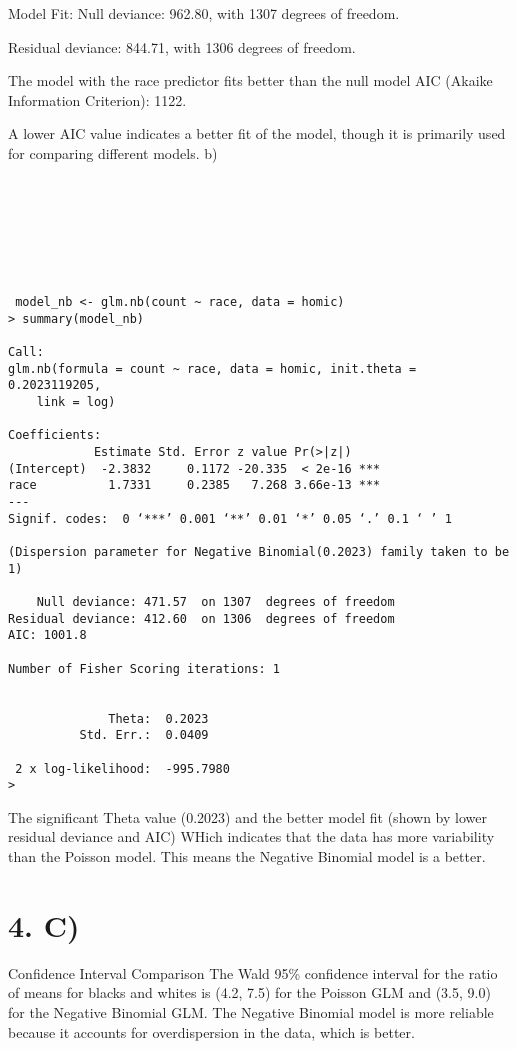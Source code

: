 \documentclass{article}
\begin{document}
Model Fit:
Null deviance: 962.80, with 1307 degrees of freedom.

Residual deviance: 844.71, with 1306 degrees of freedom.

The model with the race predictor fits better than the null model
AIC (Akaike Information Criterion): 1122.

A lower AIC value indicates a better fit of the model, though it is primarily used for comparing different models.
\newline
\newline
\newline
b)
\begin{verbatim}







 model_nb <- glm.nb(count ~ race, data = homic)
> summary(model_nb)

Call:
glm.nb(formula = count ~ race, data = homic, init.theta = 0.2023119205,
    link = log)

Coefficients:
            Estimate Std. Error z value Pr(>|z|)
(Intercept)  -2.3832     0.1172 -20.335  < 2e-16 ***
race          1.7331     0.2385   7.268 3.66e-13 ***
---
Signif. codes:  0 ‘***’ 0.001 ‘**’ 0.01 ‘*’ 0.05 ‘.’ 0.1 ‘ ’ 1

(Dispersion parameter for Negative Binomial(0.2023) family taken to be 1)

    Null deviance: 471.57  on 1307  degrees of freedom
Residual deviance: 412.60  on 1306  degrees of freedom
AIC: 1001.8

Number of Fisher Scoring iterations: 1


              Theta:  0.2023
          Std. Err.:  0.0409

 2 x log-likelihood:  -995.7980
>
\end{verbatim}


The significant Theta value (0.2023) and the better model fit (shown by lower residual deviance and AIC) WHich indicates that the data has more variability than the Poisson model. This means the Negative Binomial model is a better.




\section{ 4. C) }
Confidence Interval Comparison
The Wald 95\% confidence interval for the ratio of means for blacks and whites is (4.2, 7.5) for the Poisson GLM and (3.5, 9.0) for the Negative Binomial GLM. The Negative Binomial model is more reliable because it accounts for overdispersion in the data, which is better.
\end{document}
